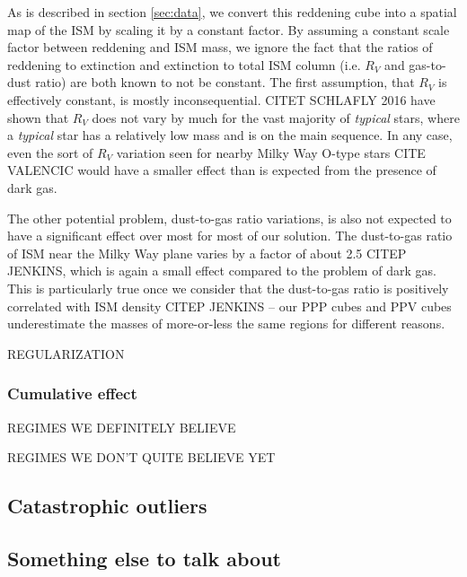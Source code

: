 As is described in section \ref{sec:data}, we convert this reddening cube into a spatial map of the ISM by scaling it by a constant factor. By assuming a constant scale factor between reddening and ISM mass, we ignore the fact that the ratios of reddening to extinction and extinction to total ISM column (i.e. $R_V$ and gas-to-dust ratio) are both known to not be constant. The first assumption, that $R_V$ is effectively constant, is mostly inconsequential. CITET SCHLAFLY 2016 have shown that $R_V$ does not vary by much for the vast majority of \emph{typical} stars, where a \emph{typical} star has a relatively low mass and is on the main sequence. In any case, even the sort of $R_V$ variation seen for nearby Milky Way O-type stars CITE VALENCIC would have a smaller effect than is expected from the presence of dark gas. 

The other potential problem, dust-to-gas ratio variations, is also not expected to have a significant effect over most for most of our solution. The dust-to-gas ratio of ISM near the Milky Way plane varies by a factor of about 2.5 CITEP JENKINS, which is again a small effect compared to the problem of dark gas. This is particularly true once we consider that the dust-to-gas ratio is positively correlated with ISM density CITEP JENKINS -- our PPP cubes and PPV cubes underestimate the masses of more-or-less the same regions for different reasons. 

REGULARIZATION

\subsubsection{Cumulative effect}
REGIMES WE DEFINITELY BELIEVE

REGIMES WE DON'T QUITE BELIEVE YET

\subsection{Catastrophic outliers}
\label{sec:discussion-catastrophic}

\subsection{Something else to talk about}